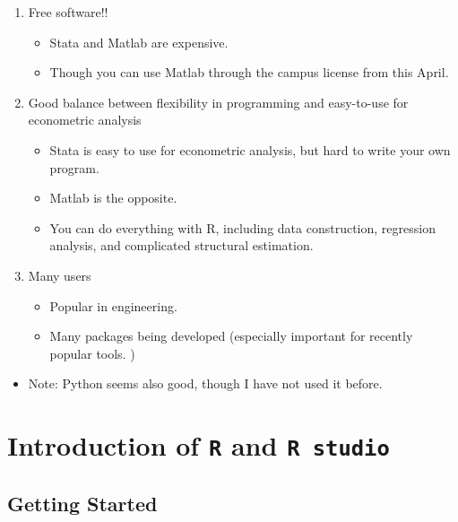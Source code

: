 \documentclass[]{book}
\providecommand{\tightlist}{%
  \setlength{\itemsep}{0pt}\setlength{\parskip}{0pt}}
\begin{document}
\begin{enumerate}
\def\labelenumi{\arabic{enumi}.}
\tightlist
\item
  Free software!!

  \begin{itemize}
  \tightlist
  \item
    Stata and Matlab are expensive.
  \item
    Though you can use Matlab through the campus license from this
    April.
  \end{itemize}
\item
  Good balance between flexibility in programming and easy-to-use for
  econometric analysis

  \begin{itemize}
  \tightlist
  \item
    Stata is easy to use for econometric analysis, but hard to write
    your own program.
  \item
    Matlab is the opposite.
  \item
    You can do everything with R, including data construction,
    regression analysis, and complicated structural estimation.
  \end{itemize}
\item
  Many users

  \begin{itemize}
  \tightlist
  \item
    Popular in engineering.
  \item
    Many packages being developed (especially important for recently
    popular tools. )
  \end{itemize}
\end{enumerate}

\begin{itemize}
\tightlist
\item
  Note: Python seems also good, though I have not used it before.
\end{itemize}

\chapter{\texorpdfstring{Introduction of \texttt{R} and
\texttt{R\ studio}}{Introduction of R and R studio}}\label{introduction-of-r-and-r-studio}

\section{Getting Started}\label{getting-started}
\end{document}
